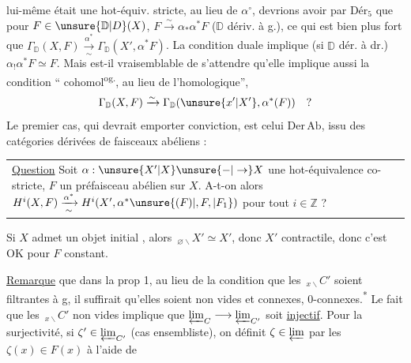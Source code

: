 lui-même était une hot-équiv. stricte, au lieu de $\alpha^\circ$, devrions avoir par $\mathrm{Dér}_5$ que pour $F\in\unsure{\mathbb D|D}(X)$, $F\xrightarrow{\sim}\alpha_*\alpha^*F$ ($\mathbb D$ dériv. à g.), ce qui est bien plus fort que $\Gamma_{\mathbb D}(X,F)\xrightarrow[\sim]{\alpha^*}\Gamma_{\mathbb D}(X',\alpha^*F)$.  La condition duale implique (si $\mathbb D$ dér. à dr.) $\alpha_!\alpha^*F\simeq F$. Mais est-il vraisemblable de s'attendre qu'elle implique aussi la condition ``  cohomol\textsuperscript{og.}, au lieu de l'homologique'',
\[
 \Gamma_{\mathbb D}(X,F)\xrightarrow{\sim}\Gamma_{\mathbb D}(\unsure{x'|X'},\alpha^*(F))\quad ?
\]
Le premier cas, qui devrait emporter conviction, est celui    $\mathrm{Der\,Ab}$, issu des catégories dérivées de faisceaux abéliens :

\noindent\begin{tabular}{||p{.89\linewidth}}
\uline{Question} Soit $\alpha:\unsure{X'|X}\unsure{-|\to}X$ une hot-équivalence co-stricte, $F$ un préfaisceau abélien sur $X$. A-t-on alors $H^i(X,F)\xrightarrow[\sim]{\alpha^*}H^i(X',\alpha^*\unsure{(F)|,F,|F_1})$ pour tout $i\in\mathbb Z$ ?
\end{tabular}

Si $X$ admet un objet  initial \inserted{$\varnothing$}, alors $\,{}_{\varnothing\backslash}X'\simeq X'$, donc $X'$ contractile, donc c'est OK pour $F$ constant.

\uline{Remarque}  que dans la prop 1, au lieu de la condition  que les $\,{}_{x\backslash}C'$ soient  filtrantes à g, il suffirait qu'elles soient non vides et  connexes, $0$-connexes.\textsuperscript{*}
Le fait que les $\,{}_{x\backslash}C'$ non vides implique que $\varprojlim_C\longrightarrow\varprojlim_{C'}$ soit \uline{injectif}. Pour la surjectivité, si $\zeta'\in\varprojlim_{C'}$ (cas ensembliste), on définit $\zeta\in\varprojlim$ par les $\zeta(x)\in F(x)$ à l'aide de
